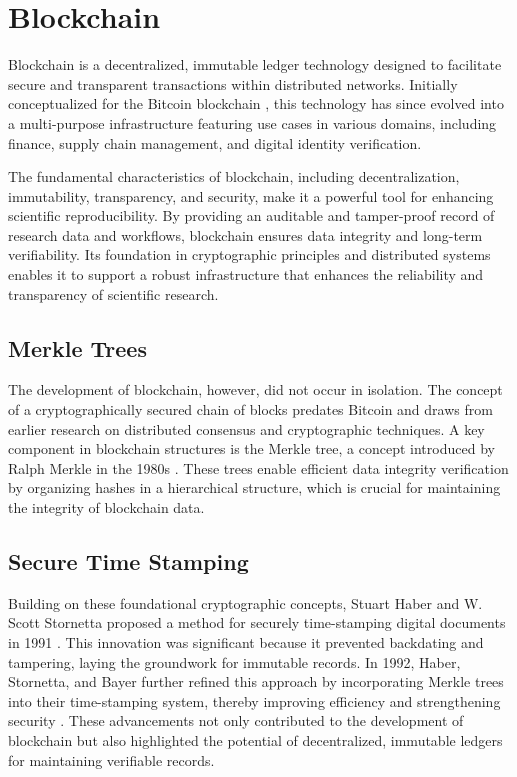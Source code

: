 \documentclass[final]{rc-book-2.14}
\begin{document}
\section{Blockchain}
\label{chp:background:sec:bct}

Blockchain is a decentralized, immutable ledger technology designed to facilitate secure and transparent transactions within distributed networks. Initially conceptualized for the Bitcoin blockchain \cite{nakamoto2008bitcoin}, this technology has since evolved into a multi-purpose infrastructure featuring use cases in various domains, including finance, supply chain management, and digital identity verification.

The fundamental characteristics of blockchain, including decentralization, immutability, transparency, and security, make it a powerful tool for enhancing scientific reproducibility. By providing an auditable and tamper-proof record of research data and workflows, blockchain ensures data integrity and long-term verifiability. Its foundation in cryptographic principles and distributed systems enables it to support a robust infrastructure that enhances the reliability and transparency of scientific research.

\subsection{Merkle Trees}

The development of blockchain, however, did not occur in isolation. The concept of a cryptographically secured chain of blocks predates Bitcoin and draws from earlier research on distributed consensus and cryptographic techniques. A key component in blockchain structures is the Merkle tree, a concept introduced by Ralph Merkle in the 1980s \cite{goos_digital_1988}. These trees enable efficient data integrity verification by organizing hashes in a hierarchical structure, which is crucial for maintaining the integrity of blockchain data.

\subsection{Secure Time Stamping}

Building on these foundational cryptographic concepts, Stuart Haber and W. Scott Stornetta proposed a method for securely time-stamping digital documents in 1991 \cite{haber_how_1991}. This innovation was significant because it prevented backdating and tampering, laying the groundwork for immutable records. In 1992, Haber, Stornetta, and Bayer further refined this approach by incorporating Merkle trees into their time-stamping system, thereby improving efficiency and strengthening security \cite{bayer1993improving}. These advancements not only contributed to the development of blockchain but also highlighted the potential of decentralized, immutable ledgers for maintaining verifiable records.
\end{document}
